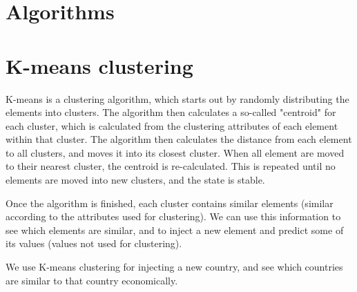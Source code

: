 \section{Algorithms}
\label{Algo}
\section{K-means clustering}
K-means is a clustering algorithm, which starts out by randomly distributing the elements into clusters. The algorithm then calculates a so-called "centroid" for each cluster, which is calculated from the clustering attributes of each element within that cluster. The algorithm then calculates the distance from each element to all clusters, and moves it into its closest cluster. When all element are moved to their nearest cluster, the centroid is re-calculated. This is repeated until no elements are moved into new clusters, and the state is stable.

Once the algorithm is finished, each cluster contains similar elements (similar according to the attributes used for clustering). We can use this information to see which elements are similar, and to inject a new element and predict some of its values (values not used for clustering).

We use K-means clustering for injecting a new country, and see which countries are similar to that country economically.